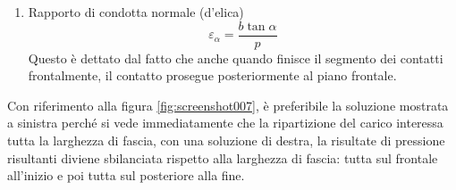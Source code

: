 \documentclass[a4paper, 15pt]{article}
\begin{document}
\begin{adjustwidth}{2in}{}
\begin{enumerate}
			\item Rapporto di condotta normale (d'elica)
			\[\varepsilon_\alpha = \dfrac{b\tan\alpha}{p}\]
			Questo è dettato dal fatto che anche quando finisce il segmento dei contatti frontalmente, il contatto prosegue posteriormente al piano frontale. 
		\end{enumerate}  

Con riferimento alla figura \ref{fig:screenshot007}, è preferibile la soluzione mostrata a sinistra perché si vede immediatamente che la ripartizione del carico interessa tutta la larghezza di fascia, con una soluzione di destra, la risultate di pressione risultanti diviene sbilanciata rispetto alla larghezza di fascia: tutta sul frontale all'inizio e poi tutta sul posteriore alla fine. 	
	
\end{adjustwidth}
\end{document}
